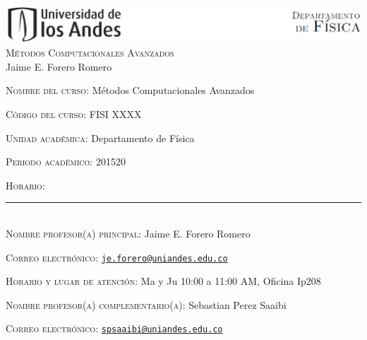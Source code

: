 \documentclass[letterpaper,10pt,onecolumn]{article}
\begin{document}
\begin{center}

\includegraphics[width=490pt]{header.png}\\[0.5cm]

\textsc{\LARGE M\'etodos Computacionales Avanzados}\\[0.1cm]

\large Jaime E. Forero Romero\\[0.5cm]

\end{center}

\large \noindent\textsc{Nombre del curso:}  M\'etodos Computacionales Avanzados%
  
\noindent\textsc{C\'odigo del curso:} FISI XXXX %

\noindent\textsc{Unidad acad\'emica:} Departamento de F\'isica

\noindent\textsc{Periodo acad\'emico:} 201520 %

\noindent\textsc{Horario:} %

\noindent\rule{\textwidth}{1pt}\\[-0.3cm]

\normalsize \noindent\textsc{Nombre profesor(a) principal:} Jaime
E. Forero Romero%

\noindent\textsc{Correo electr\'onico:}
\href{mailto:je.forero@uniandes.edu.co}{\nolinkurl{je.forero@uniandes.edu.co}}

\noindent\textsc{Horario y lugar de atenci\'on:} Ma y Ju 10:00 a
11:00 AM, Oficina Ip208 %

\noindent\textsc{Nombre profesor(a) complementario(a):} Sebastian Perez Saaibi %

\noindent\textsc{Correo electr\'onico:}
\href{mailto:spsaaibi@uniandes.edu.co}{\nolinkurl{spsaaibi@uniandes.edu.co}}
\end{document}
